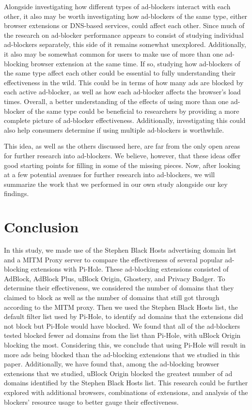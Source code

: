 \documentclass[sigsmall]{acmart}
\begin{document}
 Alongside investigating how different types of ad-blockers interact with each other, it also may be worth investigating how ad-blockers of the same type, either browser extensions or DNS-based services, could affect each other. Since much of the research on ad-blocker performance appears to consist of studying individual ad-blockers separately, this side of it remains somewhat unexplored. Additionally, it also may be somewhat common for users to make use of more than one ad-blocking browser extension at the same time. If so, studying how ad-blockers of the same type affect each other could be essential to fully understanding their effectiveness in the wild. This could be in terms of how many ads are blocked by each active ad-blocker, as well as how each ad-blocker affects the browser’s load times. Overall, a better understanding of the effects of using more than one ad-blocker of the same type could be beneficial to researchers by providing a more complete picture of ad-blocker effectiveness. Additionally, investigating this could also help consumers determine if using multiple ad-blockers is worthwhile.
	
 This idea, as well as the others discussed here, are far from the only open areas for further research into ad-blockers. We believe, however, that these ideas offer good starting points for filling in some of the missing pieces. Now, after looking at a few potential avenues for further research into ad-blockers, we will summarize the work that we performed in our own study alongside our key findings.

\section*{Conclusion}
In this study, we made use of the Stephen Black Hosts advertising domain list and a MITM Proxy server to compare the effectiveness of several popular ad-blocking extensions with Pi-Hole. These ad-blocking extensions consisted of AdBlock, AdBlock Plus, uBlock Origin, Ghostery, and Privacy Badger. To determine their effectiveness, we considered the number of domains that they claimed to block as well as the number of domains that still got through according to the MITM proxy. Then we used the Stephen Black Hosts list, the default filter list used by Pi-Hole, to identify ad domains that the extensions did not block but Pi-Hole would have blocked. We found that all of the ad-blockers tested blocked fewer ad domains from the list than Pi-Hole, with uBlock Origin blocking the most. Considering this, we conclude that using Pi-Hole will result in more ads being blocked than the ad-blocking extensions that we studied in this paper. Additionally, we have found that, among the ad-blocking browser extensions that we studied, uBlock Origin blocked the greatest number of ad domains identified by the Stephen Black Hosts list. This research could be further explored with additional browsers, combinations of extensions, and analysis of the blockers' resource usage to better gauge their effectiveness. 



\end{document}
